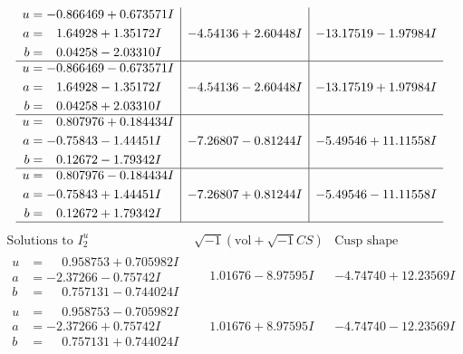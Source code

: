 \documentclass[1p]{elsarticle_modified}
\theoremstyle{definition}
\newcommand{\I}{\sqrt{-1}}
\begin{document}
$$\begin{array}{c|c|c}
\begin{aligned}
u &= -0.866469 + 0.673571 I \\
a &= \phantom{-}1.64928 + 1.35172 I \\
b &= \phantom{-}0.04258 - 2.03310 I\end{aligned}
 & -4.54136 + 2.60448 I & -13.17519 - 1.97984 I \\ \hline\begin{aligned}
u &= -0.866469 - 0.673571 I \\
a &= \phantom{-}1.64928 - 1.35172 I \\
b &= \phantom{-}0.04258 + 2.03310 I\end{aligned}
 & -4.54136 - 2.60448 I & -13.17519 + 1.97984 I \\ \hline\begin{aligned}
u &= \phantom{-}0.807976 + 0.184434 I \\
a &= -0.75843 - 1.44451 I \\
b &= \phantom{-}0.12672 - 1.79342 I\end{aligned}
 & -7.26807 - 0.81244 I & -5.49546 + 11.11558 I \\ \hline\begin{aligned}
u &= \phantom{-}0.807976 - 0.184434 I \\
a &= -0.75843 + 1.44451 I \\
b &= \phantom{-}0.12672 + 1.79342 I\end{aligned}
 & -7.26807 + 0.81244 I & -5.49546 - 11.11558 I\\
 \hline 
 \end{array}$$\newpage$$\begin{array}{c|c|c}  
\text{Solutions to }I^u_{2}& \I (\text{vol} + \sqrt{-1}CS) & \text{Cusp shape}\\
 \hline 
\begin{aligned}
u &= \phantom{-}0.958753 + 0.705982 I \\
a &= -2.37266 - 0.75742 I \\
b &= \phantom{-}0.757131 - 0.744024 I\end{aligned}
 & \phantom{-}1.01676 - 8.97595 I & -4.74740 + 12.23569 I \\ \hline\begin{aligned}
u &= \phantom{-}0.958753 - 0.705982 I \\
a &= -2.37266 + 0.75742 I \\
b &= \phantom{-}0.757131 + 0.744024 I\end{aligned}
 & \phantom{-}1.01676 + 8.97595 I & -4.74740 - 12.23569 I \\ \hline\begin{aligned}

\end{aligned}
\end{array}$$
\end{document}
